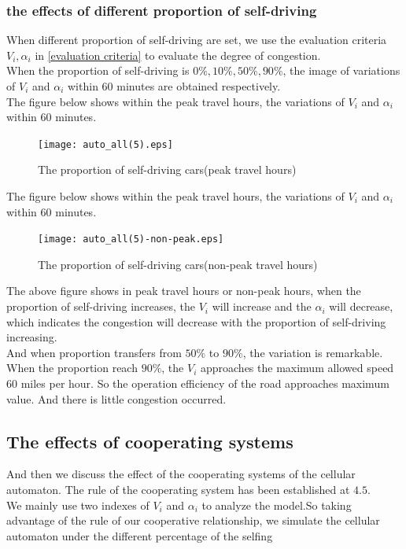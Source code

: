 \documentclass{mcmthesis}
\begin{document}
\subsubsection{the effects of different proportion of self-driving }
When different proportion of self-driving are set, we use the evaluation criteria $V_{i}, \alpha_{i}$ in \ref{evaluation criteria} to evaluate the degree of congestion. \\
\indent When the proportion of self-driving is $0\%, 10\%, 50\%, 90\%$, the image of variations of $V_{i}$ and $\alpha_{i}$ within 60 minutes are obtained respectively.\\
\indent The figure below shows within the peak travel hours, the variations of $V_{i}$ and $\alpha_{i}$ within 60 minutes.\\
\begin{figure}[H]
	\centerline{\texttt{[image: auto\_all(5).eps]}}
	\caption{The proportion of self-driving cars(peak travel hours)}	
\end{figure}
\indent The figure below shows within the peak travel hours, the variations of $V_{i}$ and $\alpha_{i}$ within 60 minutes.\\
\begin{figure}[H]
	\centerline{\texttt{[image: auto\_all(5)-non-peak.eps]}}
	\caption{The proportion of self-driving cars(non-peak travel hours)}	
\end{figure}
\indent The above figure shows in peak travel hours or non-peak hours, when the proportion of self-driving increases, the $V_{i}$ will increase and the $\alpha_{i}$ will decrease, which indicates the congestion will decrease with the proportion of self-driving increasing.\\
\indent And when proportion transfers from $50\% $ to $90\% $, the variation is remarkable. When the proportion reach $90\%$, the $V_{i}$ approaches the maximum allowed speed 60 miles per hour. So the operation efficiency of the road approaches maximum value. And there is little congestion occurred. \\

\subsection{The effects of cooperating systems}
And then we discuss the effect of the cooperating systems of the cellular automaton. The rule of the cooperating system has been established at $4.5$. \\
\indent We mainly use two indexes of $V_{i}$ and $\alpha_{i}$ to analyze the model.So taking advantage of the rule of our cooperative relationship, we simulate the cellular automaton under the different percentage of the selfing 
\end{document}
